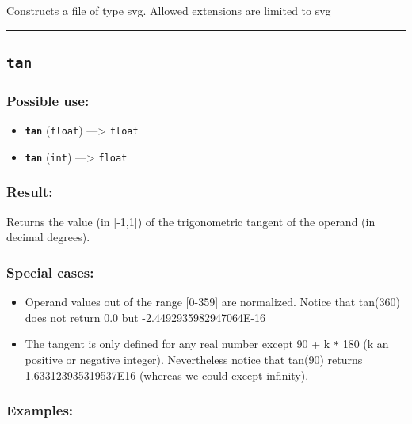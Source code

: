 \documentclass[]{book}
\providecommand{\tightlist}{%
  \setlength{\itemsep}{0pt}\setlength{\parskip}{0pt}}
\theoremstyle{definition}
\theoremstyle{definition}
\theoremstyle{definition}
\theoremstyle{remark}
\begin{document}
Constructs a file of type svg. Allowed extensions are limited to svg

\begin{center}\rule{0.5\linewidth}{\linethickness}\end{center}

\subsection{\texorpdfstring{\texttt{tan}}{tan}}\label{tan}

\subsubsection{Possible use:}\label{possible-use-512}

\begin{itemize}
\tightlist
\item
  \textbf{\texttt{tan}} (\texttt{float}) ---\textgreater{}
  \texttt{float}
\item
  \textbf{\texttt{tan}} (\texttt{int}) ---\textgreater{} \texttt{float}
\end{itemize}

\subsubsection{Result:}\label{result-495}

Returns the value (in {[}-1,1{]}) of the trigonometric tangent of the
operand (in decimal degrees).

\subsubsection{Special cases:}\label{special-cases-134}

\begin{itemize}
\tightlist
\item
  Operand values out of the range {[}0-359{]} are normalized. Notice
  that tan(360) does not return 0.0 but -2.4492935982947064E-16\\
\item
  The tangent is only defined for any real number except 90 + k
  \texttt{*} 180 (k an positive or negative integer). Nevertheless
  notice that tan(90) returns 1.633123935319537E16 (whereas we could
  except infinity).
\end{itemize}

\subsubsection{Examples:}\label{examples-354}
\end{document}
